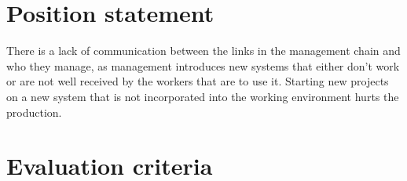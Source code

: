 \section{Position  statement}
There is a lack of communication between the links in the management chain and who they manage, as management introduces new systems that either don't work or are not well received by the workers that are to use it. Starting new projects on a new system that is not incorporated into the working environment hurts the production.

\section{Evaluation criteria}



